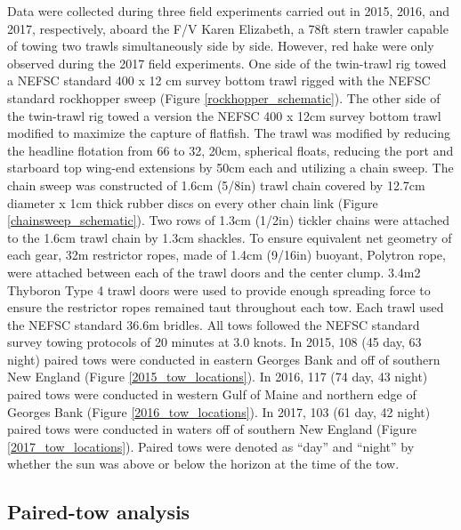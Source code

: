 \documentclass[]{article}
\begin{document}
Data were collected during three field experiments carried out in 2015,
2016, and 2017, respectively, aboard the F/V Karen Elizabeth, a 78ft
stern trawler capable of towing two trawls simultaneously side by side.
However, red hake were only observed during the 2017 field experiments.
One side of the twin-trawl rig towed a NEFSC standard 400 x 12 cm survey
bottom trawl rigged with the NEFSC standard rockhopper sweep
\citep{politisetal14} (Figure \ref{rockhopper_schematic}). The other
side of the twin-trawl rig towed a version the NEFSC 400 x 12cm survey
bottom trawl modified to maximize the capture of flatfish. The trawl was
modified by reducing the headline flotation from 66 to 32, 20cm,
spherical floats, reducing the port and starboard top wing-end
extensions by 50cm each and utilizing a chain sweep. The chain sweep was
constructed of 1.6cm (5/8in) trawl chain covered by 12.7cm diameter x
1cm thick rubber discs on every other chain link (Figure
\ref{chainsweep_schematic}). Two rows of 1.3cm (1/2in) tickler chains
were attached to the 1.6cm trawl chain by 1.3cm shackles. To ensure
equivalent net geometry of each gear, 32m restrictor ropes, made of
1.4cm (9/16in) buoyant, Polytron rope, were attached between each of the
trawl doors and the center clump. 3.4m2 Thyboron Type 4 trawl doors were
used to provide enough spreading force to ensure the restrictor ropes
remained taut throughout each tow. Each trawl used the NEFSC standard
36.6m bridles. All tows followed the NEFSC standard survey towing
protocols of 20 minutes at 3.0 knots. In 2015, 108 (45 day, 63 night)
paired tows were conducted in eastern Georges Bank and off of southern
New England (Figure \ref{2015_tow_locations}). In 2016, 117 (74 day, 43
night) paired tows were conducted in western Gulf of Maine and northern
edge of Georges Bank (Figure \ref{2016_tow_locations}). In 2017, 103 (61
day, 42 night) paired tows were conducted in waters off of southern New
England (Figure \ref{2017_tow_locations}). Paired tows were denoted as
``day'' and ``night'' by whether the sun was above or below the horizon
at the time of the tow.

\hypertarget{paired-tow-analysis}{%
\subsection{Paired-tow analysis}\label{paired-tow-analysis}}
\end{document}
